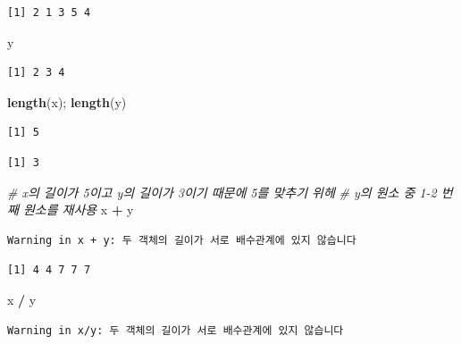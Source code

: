 \documentclass[
  11pt,
]{krantz}
\newenvironment{Shaded}{\begin{snugshade}}{\end{snugshade}}
\newcommand{\CommentTok}[1]{\textcolor[rgb]{0.37,0.37,0.37}{\textit{#1}}}
\newcommand{\KeywordTok}[1]{\textcolor[rgb]{0.27,0.27,0.27}{\textbf{#1}}}
\newcommand{\NormalTok}[1]{#1}
\newcommand{\OperatorTok}[1]{\textcolor[rgb]{0.43,0.43,0.43}{\textbf{#1}}}
\newcommand{\StringTok}[1]{\textcolor[rgb]{0.5,0.5,0.5}{#1}}
\begin{document}
\begin{verbatim}
[1] 2 1 3 5 4
\end{verbatim}

\begin{Shaded}
\begin{Highlighting}[]
\NormalTok{y}
\end{Highlighting}
\end{Shaded}

\begin{verbatim}
[1] 2 3 4
\end{verbatim}

\begin{Shaded}
\begin{Highlighting}[]
\KeywordTok{length}\NormalTok{(x); }\KeywordTok{length}\NormalTok{(y)}
\end{Highlighting}
\end{Shaded}

\begin{verbatim}
[1] 5
\end{verbatim}

\begin{verbatim}
[1] 3
\end{verbatim}

\begin{Shaded}
\begin{Highlighting}[]
\CommentTok{# x의 길이가 5이고 y의 길이가 3이기 때문에 5를 맞추기 위헤}
\CommentTok{# y의 원소 중 1-2 번째 원소를 재사용}
\NormalTok{x }\OperatorTok{+}\StringTok{ }\NormalTok{y}
\end{Highlighting}
\end{Shaded}

\begin{verbatim}
Warning in x + y: 두 객체의 길이가 서로 배수관계에 있지 않습니다
\end{verbatim}

\begin{verbatim}
[1] 4 4 7 7 7
\end{verbatim}

\begin{Shaded}
\begin{Highlighting}[]
\NormalTok{x }\OperatorTok{/}\StringTok{ }\NormalTok{y}
\end{Highlighting}
\end{Shaded}

\begin{verbatim}
Warning in x/y: 두 객체의 길이가 서로 배수관계에 있지 않습니다
\end{verbatim}
\end{document}
